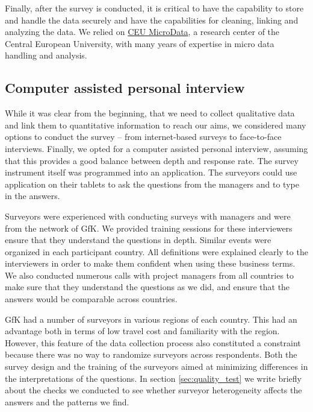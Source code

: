 \documentclass[final, dvipsnames, authoryear,12pt]{elsarticle}
\begin{document}
Finally, after the survey is conducted, it is critical to have the capability to store and handle the data securely and have the capabilities for cleaning, linking and analyzing the data. We relied on \href{http://microdata.io/}{CEU MicroData}, a research center of the Central European University, with many years of expertise in micro data handling and analysis. 

\subsection{Computer assisted personal interview}

While it was clear from the beginning, that  we need to collect qualitative data and link them to quantitative information to reach our aims, we considered many options to conduct the survey -- from internet-based surveys to face-to-face interviews. Finally, we opted for a computer assisted personal interview, assuming that this provides a good balance between depth and response rate. The survey instrument itself was programmed into an application. The surveyors could use application on their tablets to ask the questions from the managers and to type in the answers.



Surveyors were experienced with conducting surveys with managers and were from the network of GfK. We provided training sessions for these interviewers ensure that they understand the questions in depth. Similar events were organized in each participant country. All definitions were explained clearly to the interviewers in order to make them confident when using these business terms. We also conducted numerous calls with project managers from all countries to make sure that they understand the questions as we did, and ensure that the answers would be comparable across countries. 

GfK had a number of surveyors in various regions of each country. This had an advantage both in terms of low travel cost and familiarity with the region. However, this feature of the data collection process also constituted a constraint because there was no way to randomize surveyors across respondents. Both the survey design and the training of the surveyors aimed at minimizing differences in the interpretations of the questions. In section \ref{sec:quality_test} we write briefly about the checks we conducted to see whether surveyor heterogeneity affects the answers and the patterns we find.
\end{document}
